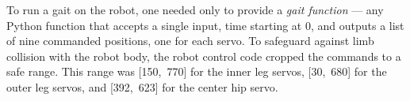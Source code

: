 To run a gait on the robot, one needed only to provide a \emph{gait
  function} --- any Python function that accepts a single input, time
starting at 0, and outputs a list of nine commanded positions, one for
each servo.  To safeguard against limb collision with the robot body,
the robot control code cropped the commands to a safe range.  This
range was [150,~770] for the inner leg servos, [30,~680] for the outer
leg servos, and [392,~623] for the center hip servo.





